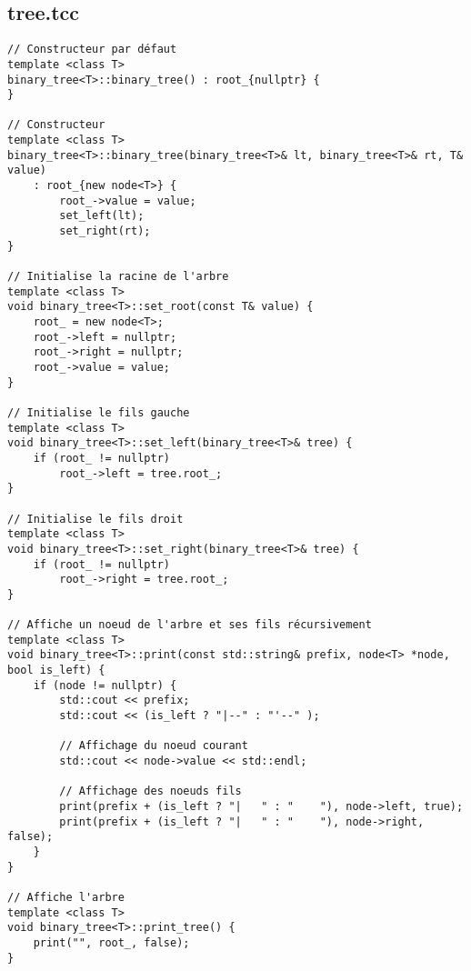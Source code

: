\subsection{tree.tcc}
\begin{verbatim}
// Constructeur par défaut
template <class T>
binary_tree<T>::binary_tree() : root_{nullptr} {
}

// Constructeur
template <class T>
binary_tree<T>::binary_tree(binary_tree<T>& lt, binary_tree<T>& rt, T& value) 
    : root_{new node<T>} {
        root_->value = value;
        set_left(lt);
        set_right(rt);
}

// Initialise la racine de l'arbre
template <class T>
void binary_tree<T>::set_root(const T& value) {
    root_ = new node<T>;
    root_->left = nullptr;
    root_->right = nullptr;
    root_->value = value;
}

// Initialise le fils gauche
template <class T>
void binary_tree<T>::set_left(binary_tree<T>& tree) {
    if (root_ != nullptr) 
        root_->left = tree.root_;
}

// Initialise le fils droit 
template <class T>
void binary_tree<T>::set_right(binary_tree<T>& tree) {
    if (root_ != nullptr)
        root_->right = tree.root_;
}

// Affiche un noeud de l'arbre et ses fils récursivement
template <class T>
void binary_tree<T>::print(const std::string& prefix, node<T> *node, bool is_left) {
    if (node != nullptr) {
        std::cout << prefix;
        std::cout << (is_left ? "|--" : "'--" );

        // Affichage du noeud courant
        std::cout << node->value << std::endl;

        // Affichage des noeuds fils
        print(prefix + (is_left ? "|   " : "    "), node->left, true);
        print(prefix + (is_left ? "|   " : "    "), node->right, false);
    }
}

// Affiche l'arbre
template <class T>
void binary_tree<T>::print_tree() {
    print("", root_, false);
}
\end{verbatim}

